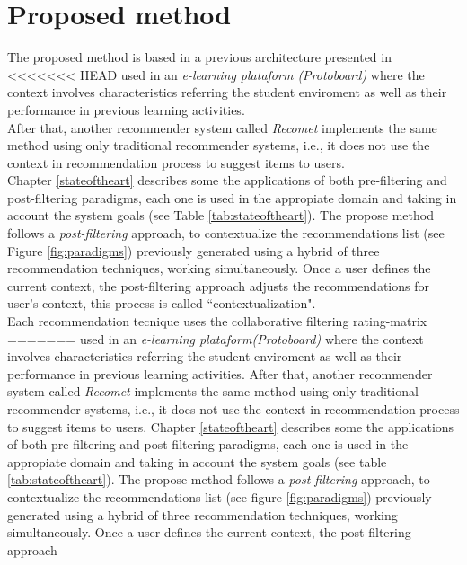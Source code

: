 \chapter{Proposed method}\label{method}

The proposed method is based  in a previous architecture presented in
<<<<<<< HEAD
  \cite{garcia2009hybrid} used in an \textit{e-learning plataform (Protoboard)}
where the context  involves characteristics referring the student
enviroment as well as their performance in previous learning activities.  \\ 
After that, another recommender system called \textit{Recomet}  
 \cite{ramirez2013restaurant} implements the same method using 
only traditional recommender systems, i.e., it does not use the context 
in recommendation process  to suggest items to users.   \\ 
Chapter  \ref{stateoftheart} describes some the applications of both pre-filtering and 
post-filtering paradigms, each one is used in the appropiate domain 
and taking in account the system goals (see Table  \ref{tab:stateoftheart}).  
The propose method follows a \textit{post-filtering} approach, 
to contextualize the recommendations list
(see Figure  \ref{fig:paradigms}) previously generated using a hybrid
of three recommendation techniques, working simultaneously.
Once a user defines the current context, the post-filtering approach
adjusts the  recommendations for user's context, this process is called
``contextualization". \\ 
Each recommendation tecnique uses the collaborative filtering rating-matrix 
=======
\cite{garcia2009hybrid} used in an \textit{e-learning plataform(Protoboard)}
where the context  involves characteristics referring the student
enviroment as well as their performance in previous learning activities.  
After that,
another recommender system called \textit{Recomet}\cite{ramirez2013restaurant}
implements the same method using only traditional recommender systems,
i.e., it does not use the context in recommendation process  to
suggest items to users.  
Chapter \ref{stateoftheart} describes some the applications of both pre-filtering and 
post-filtering paradigms, each one is used in the appropiate domain 
and taking in account the system goals (see table \ref{tab:stateoftheart}).  
The propose method follows a \textit{post-filtering} approach, to contextualize
the recommendations list
(see figure \ref{fig:paradigms}) previously generated using a hybrid
of three recommendation techniques, working simultaneously.
Once a user defines the current context, the post-filtering approach
